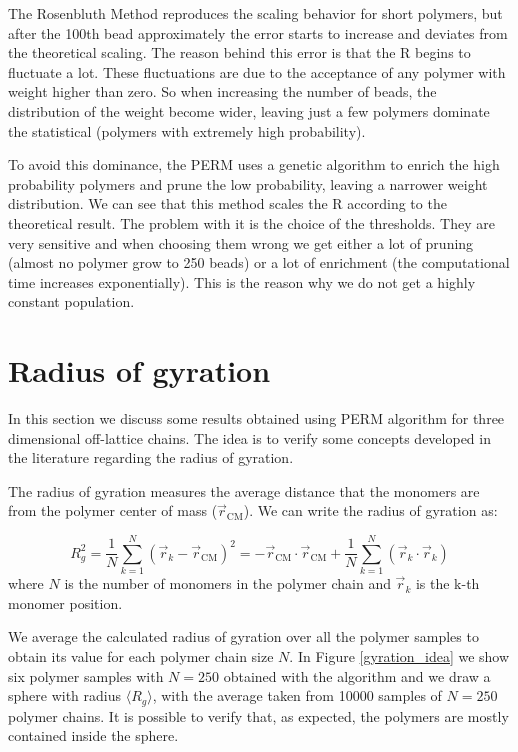 \documentclass[aps,prl,reprint,groupedaddress]{revtex4-1}
\begin{document}
The Rosenbluth Method reproduces the scaling behavior for short polymers, but after the 100th bead approximately the error starts to increase and deviates from the theoretical scaling. The reason behind this error is that the R begins to fluctuate a lot. These fluctuations are due to the acceptance of any polymer with weight higher than zero. So when increasing the number of beads, the distribution of the weight become wider, leaving just a few polymers dominate the statistical (polymers with extremely high probability). 

To avoid this dominance, the PERM uses a genetic algorithm to enrich the high probability polymers and prune the low probability, leaving a narrower weight distribution. We can see that this method scales the R according to the theoretical result. The problem with it is the choice of the thresholds. They are very sensitive and when choosing them wrong we get either a lot of pruning (almost no polymer grow to 250 beads) or  a lot of enrichment (the computational time increases exponentially). This is the reason why we do not get a highly constant population.

\section{Radius of gyration}

In this section we discuss some results obtained using PERM algorithm for three dimensional off-lattice chains. The idea is to verify some concepts developed in the literature regarding the radius of gyration.

The radius of gyration measures the average distance that the monomers are from the polymer center of mass ($\vec{r}_{\text{CM}}$). We can write the radius of gyration as:

\begin{equation}
	R_g^2 = \frac{1}{N}\sum_{k=1}^N \left(\vec{r}_k - \vec{r}_{\text{CM}}\right)^2 = - \vec{r}_{\text{CM}} \cdot \vec{r}_{\text{CM}} + \frac{1}{N}\sum_{k=1}^N \left(\vec{r}_k \cdot \vec{r}_k \right)
\end{equation}
where $N$ is the number of monomers in the polymer chain and $\vec{r}_k$ is the k-th monomer position.

We average the calculated radius of gyration over all the polymer samples to obtain its value for each polymer chain size $N$. In Figure \ref{gyration_idea} we show six polymer samples with $N=250$ obtained with the algorithm and we draw a sphere with radius $\langle R_g\rangle$, with the average taken from 10000 samples of $N=250$ polymer chains. It is possible to verify that, as expected, the polymers are mostly contained inside the sphere.  
\end{document}
